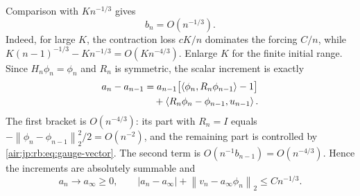 \documentclass[11pt,letterpaper]{article}
\numberwithin{equation}{section}
\theoremstyle{remark}
\newcommand{\norm}[1]{\left\lVert#1\right\rVert}
\newcommand{\ip}[2]{\left\langle#1,#2\right\rangle}
\begin{document}
Comparison with $Kn^{-1/3}$ gives
\begin{equation}\label{air:jp:rb:eq:perp}
 b_n=O(n^{-1/3}).
\end{equation}
Indeed, for large $K$, the contraction loss $cK/n$ dominates the forcing $C/n$, while $K(n-1)^{-1/3}-Kn^{-1/3}=O(Kn^{-4/3})$. Enlarge $K$ for the finite initial range.
Since $H_n\phi_n=\phi_n$ and $R_n$ is symmetric, the scalar increment is exactly
\begin{align}
 a_n-a_{n-1}
 &=a_{n-1}\bigl[\ip{\phi_n}{R_n\phi_{n-1}}-1\bigr]\notag\\
 &\quad+\ip{R_n\phi_n-\phi_{n-1}}{u_{n-1}}.\label{air:jp:rb:eq:increment}
\end{align}
The first bracket is $O(n^{-4/3})$: its part with $R_n=I$ equals
$-\norm{\phi_n-\phi_{n-1}}_2^2/2=O(n^{-2})$, and the remaining part is controlled by \eqref{air:jp:rb:eq:gauge-vector}. The second term is $O(n^{-1}b_{n-1})=O(n^{-4/3})$. Hence the increments are absolutely summable and
\begin{equation}\label{air:jp:rb:eq:l2limit}
 a_n\longrightarrow a_\infty\ge0,\qquad
 |a_n-a_\infty|+\norm{v_n-a_\infty\phi_n}_2\le Cn^{-1/3}.
\end{equation}
\end{document}
